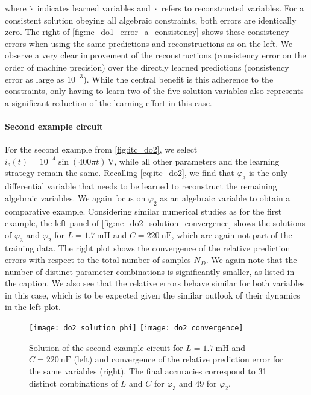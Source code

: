 \documentclass[AMA,STIX1COL]{WileyNJD-v2}
\newcommand{\mr}[1]{\mathrm{#1}}
\begin{document}
where $\hat{\cdot}$ indicates learned variables and $\bar{\cdot}$ refers to reconstructed variables. For a consistent solution obeying all algebraic constraints, both errors are identically zero. The right of \autoref{fig:ne_do1_error_a_consistency} shows these consistency errors when using the same predictions and reconstructions as on the left. We observe a very clear improvement of the reconstructions (consistency error on the order of machine precision) over the directly learned predictions (consistency error as large as $10^{-3}$). While the central benefit is this adherence to the constraints, only having to learn two of the five solution variables also represents a significant reduction of the learning effort in this case.

\paragraph{Second example circuit}
For the second example from \autoref{fig:itc_do2}, we select $i_\mr{s}(t) = 10^{-4} \sin(400 \pi t)\, \si{\volt}$, while all other parameters and the learning strategy remain the same. Recalling \eqref{eq:itc_do2}, we find that $\varphi_3$ is the only differential variable that needs to be learned to reconstruct the remaining algebraic variables. We again focus on $\varphi_2$ as an algebraic variable to obtain a comparative example. Considering similar numerical studies as for the first example, the left panel of \autoref{fig:ne_do2_solution_convergence} shows the solutions of $\varphi_3$ and $\varphi_2$ for $L = \SI{1.7}{\milli\henry}$ and $C = \SI{220}{\nano\farad}$, which are again not part of the training data. The right plot shows the convergence of the relative prediction errors with respect to the total number of samples $N_D$. We again note that the number of distinct parameter combinations is significantly smaller, as listed in the caption. We also see that the relative errors behave similar for both variables in this case, which is to be expected given the similar outlook of their dynamics in the left plot.
\begin{figure}[b]
    \begin{center}
        \texttt{[image: do2\_solution\_phi]} \hspace{1.5cm} \texttt{[image: do2\_convergence]}
    \end{center}
    \caption{Solution of the second example circuit for $L = \SI{1.7}{\milli\henry}$ and $C = \SI{220}{\nano\farad}$ (left) and convergence of the relative prediction error for the same variables (right). The final accuracies correspond to 31 distinct combinations of $L$ and $C$ for $\varphi_3$ and 49 for $\varphi_2$.}
    \label{fig:ne_do2_solution_convergence}
\end{figure}
\end{document}
